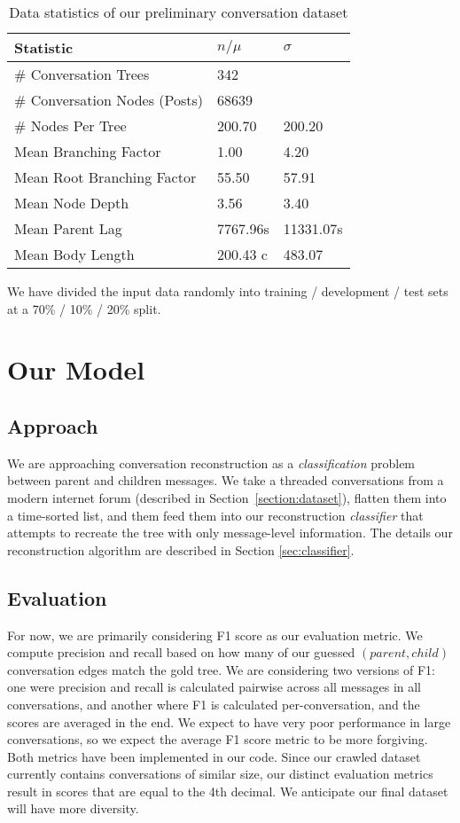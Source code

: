 \documentclass[10pt]{article}
\begin{document}
\begin{table}[h]\footnotesize
 \begin{tabular}{| l | l | l |} 
   \hline
   \textbf{Statistic} & \textbf{$n / \mu$} & \textbf{$\sigma$} \\
   \hline
    \# Conversation Trees &  342 & \\
    \# Conversation Nodes (Posts) & 68639 & \\
    \# Nodes Per Tree &  200.70 & 200.20 \\
    Mean Branching Factor & 1.00 & 4.20 \\
    Mean Root Branching Factor &  55.50 & 57.91 \\
    Mean Node Depth  & 3.56 & 3.40 \\
    Mean Parent Lag & 7767.96s & 11331.07s \\
    Mean Body Length & 200.43 c & 483.07 \\
   \hline
  \end{tabular}
  \caption{Data statistics of our preliminary conversation dataset}
  \label{table:stats}
\end{table}

We have divided the input data randomly into training / development / test 
sets at a 70\% / 10\% / 20\% split.

\section{Our Model}
\subsection{Approach}
\label{sec:approach}
We are approaching conversation reconstruction as a \textit{classification} problem
between parent and children messages. We take a threaded conversations from a modern internet forum 
(described in Section~\ref{section:dataset}), flatten them into a time-sorted list, and them feed
them into our reconstruction \textit{classifier} that attempts to recreate the tree
with only message-level information. The details our reconstruction algorithm are 
described in Section \ref{sec:classifier}.

\subsection{Evaluation}
For now, we are primarily considering F1 score as our evaluation metric. We
compute precision and recall based on how many of our guessed 
$(parent,child)$ conversation edges match the gold tree. We are considering 
two versions of F1: one were precision and recall is calculated pairwise 
across all messages in all conversations, and another where F1 is calculated 
per-conversation, and the scores are averaged in the end. We expect to have 
very poor performance  in large conversations, so we expect the average F1
score metric to be more forgiving. Both metrics have been implemented in our 
code. Since our crawled dataset currently contains conversations of similar 
size, our distinct evaluation metrics result in scores that are equal to the 
4th decimal. We anticipate our final dataset will have more diversity.
\end{document}
